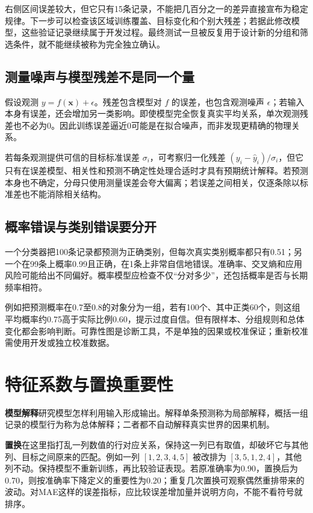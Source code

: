 右侧区间误差较大，但它只有15条记录，不能把几百分之一的差异直接宣布为稳定规律。下一步可以检查该区域训练覆盖、目标变化和个别大残差；若据此修改模型，这些验证记录继续属于开发过程。最终测试一旦被反复用于设计新的分组和筛选条件，就不能继续被称为完全独立确认。

\subsection{测量噪声与模型残差不是同一个量}
假设观测 $y=f(\mathbf x)+\epsilon$。残差包含模型对 $f$ 的误差，也包含观测噪声 $\epsilon$；若输入本身有误差，还会增加另一类影响。即使模型完全恢复真实平均关系，单次观测残差也不必为0。因此训练误差逼近0可能是在拟合噪声，而非发现更精确的物理关系。

若每条观测提供可信的目标标准误差 $\sigma_i$，可考察归一化残差 $(y_i-\hat y_i)/\sigma_i$，但它只有在误差模型、相关性和预测不确定性处理合适时才具有预期统计解释。若预测本身也不确定，分母只使用测量误差会夸大偏离；若误差之间相关，仅逐条除以标准差也不能消除相关结构。

\subsection{概率错误与类别错误要分开}
一个分类器把100条记录都预测为正确类别，但每次真实类别概率都只有0.51；另一个在99条上概率0.99且正确，在1条上非常自信地错误。准确率、交叉熵和应用风险可能给出不同偏好。概率模型应检查不仅“分对多少”，还包括概率是否与长期频率相符。

例如把预测概率在0.7至0.8的对象分为一组，若有100个、其中正类60个，则这组平均概率约0.75高于实际比例0.60，提示过度自信。但有限样本、分组规则和总体变化都会影响判断。可靠性图是诊断工具，不是单独的因果或校准保证；重新校准需使用开发或独立校准数据。

\section{特征系数与置换重要性}

\textbf{模型解释}研究模型怎样利用输入形成输出。解释单条预测称为局部解释，概括一组记录的模型行为称为总体解释；二者都不自动解释真实世界的因果机制。

\textbf{置换}在这里指打乱一列数值的行对应关系，保持这一列已有取值，却破坏它与其他列、目标之间原来的匹配。例如一列 $[1,2,3,4,5]$ 被改排为 $[3,5,1,2,4]$，其他列不动。保持模型不重新训练，再比较验证表现。若原准确率为0.90，置换后为0.70，则按准确率下降定义的重要性为0.20；重复几次置换可观察偶然重排带来的波动。对MAE这样的误差指标，应比较误差增加量并说明方向，不能不看符号就排序。

